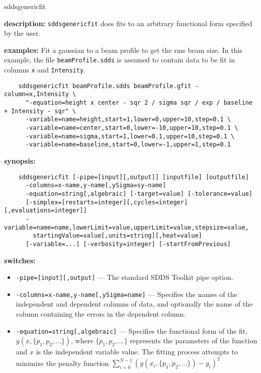 \begin{sddsprog}{sddsgenericfit}
  \item \textbf{description:} \verb|sddsgenericfit| does fits to an arbitrary functional form specified by the user.
  \item \textbf{examples:}
    Fit a gaussian to a beam profile to get the rms beam size. In this example, the
    file \verb|beamProfile.sdds| is assumed to contain data to be fit in columns
    \verb|x| and \verb|Intensity|.
    \begin{verbatim}
    sddsgenericfit beamProfile.sdds beamProfile.gfit -column=x,Intensity \
      "-equation=height x center - sqr 2 / sigma sqr / exp / baseline + Intensity - sqr" \
      -variable=name=height,start=1,lower=0,upper=10,step=0.1 \
      -variable=name=center,start=0,lower=-10,upper=10,step=0.1 \
      -variable=name=sigma,start=1,lower=0.1,upper=10,step=0.1 \
      -variable=name=baseline,start=0,lower=-1,upper=1,step=0.1
    \end{verbatim}
  \item \textbf{synopsis:}
    \begin{verbatim}
    sddsgenericfit [-pipe=[input][,output]] [inputfile] [outputfile]
      -columns=x-name,y-name[,ySigma=sy-name]
      -equation=string[,algebraic] [-target=value] [-tolerance=value]
      [-simplex=[restarts=integer][,cycles=integer][,evaluations=integer]]
      -variable=name=name,lowerLimit=value,upperLimit=value,stepsize=value,
        startingValue=value[,units=string][,heat=value]
      [-variable=...] [-verbosity=integer] [-startFromPrevious]
    \end{verbatim}
  \item \textbf{switches:}
    \begin{itemize}
      \item \verb|-pipe=[input][,output]| --- The standard SDDS Toolkit pipe option.
      \item \verb|-columns=x-name,y-name[,ySigma=name]| --- Specifies the names of the independent and dependent columns of data, and
        optionally the name of the column containing the errors in the dependent column.
      \item \verb|-equation=string[,algebraic]| --- Specifies the functional form of the fit, $y(x, \{p_1, p_2, ...\})$,
        where $\{p_1, p_2, ...\}$ represents the parameters of the function and $x$ is the independent variable value.
        The fitting process attempts to minimize the penalty function $\sum_{i=0}^{N-1} (y(x_i, \{p_1, p_2, ...\}) - y_i)^2$

\end{itemize}
\end{sddsprog}
